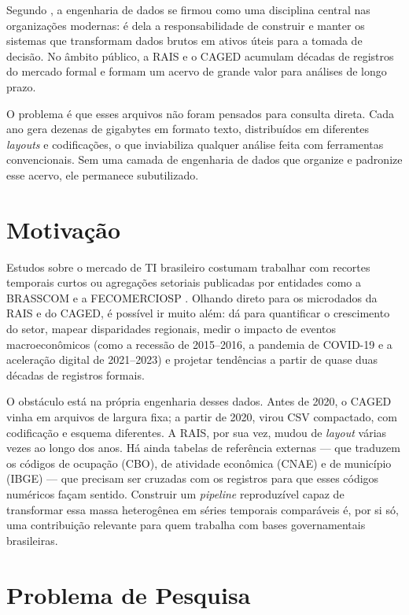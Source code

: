 Segundo , a engenharia de dados se firmou como uma disciplina central nas organizações modernas: é dela a responsabilidade de construir e manter os sistemas que transformam dados brutos em ativos úteis para a tomada de decisão. No âmbito público, a RAIS e o CAGED acumulam décadas de registros do mercado formal e formam um acervo de grande valor para análises de longo prazo.

O problema é que esses arquivos não foram pensados para consulta direta. Cada ano gera dezenas de gigabytes em formato texto, distribuídos em diferentes \textit{layouts} e codificações, o que inviabiliza qualquer análise feita com ferramentas convencionais. Sem uma camada de engenharia de dados que organize e padronize esse acervo, ele permanece subutilizado.

\section{Motivação}

Estudos sobre o mercado de TI brasileiro costumam trabalhar com recortes temporais curtos ou agregações setoriais publicadas por entidades como a BRASSCOM \cite{Brasscom2024} e a FECOMERCIOSP \cite{Fecomercio2024}. Olhando direto para os microdados da RAIS e do CAGED, é possível ir muito além: dá para quantificar o crescimento do setor, mapear disparidades regionais, medir o impacto de eventos macroeconômicos (como a recessão de 2015--2016, a pandemia de COVID-19 e a aceleração digital de 2021--2023) e projetar tendências a partir de quase duas décadas de registros formais.

O obstáculo está na própria engenharia desses dados. Antes de 2020, o CAGED vinha em arquivos de largura fixa; a partir de 2020, virou CSV compactado, com codificação e esquema diferentes. A RAIS, por sua vez, mudou de \textit{layout} várias vezes ao longo dos anos. Há ainda tabelas de referência externas --- que traduzem os códigos de ocupação (CBO), de atividade econômica (CNAE) e de município (IBGE) --- que precisam ser cruzadas com os registros para que esses códigos numéricos façam sentido. Construir um \textit{pipeline} reproduzível capaz de transformar essa massa heterogênea em séries temporais comparáveis é, por si só, uma contribuição relevante para quem trabalha com bases governamentais brasileiras.

\section{Problema de Pesquisa}
\label{sec:problema}

